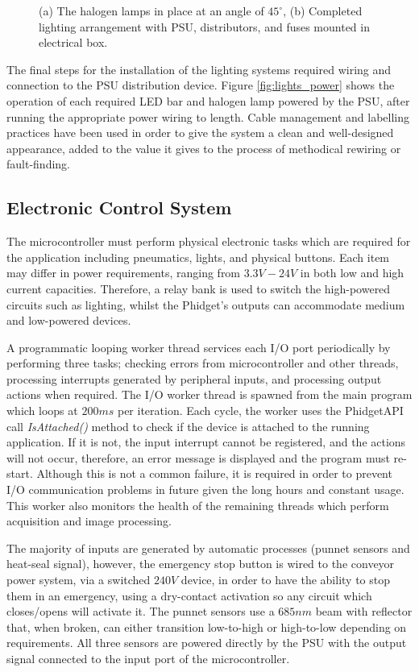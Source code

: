 \documentclass[fleqn,twoside,12pt]{report}
\begin{document}
\begin{figure}[ht]
	\caption{(a) The halogen lamps in place at an angle of $45^{\circ}$, (b) Completed lighting arrangement with PSU, distributors, and fuses mounted in electrical box.}
	\label{}
\end{figure}


The final steps for the installation of the lighting systems required wiring and connection to the PSU distribution device. Figure \ref{fig:lights_power} shows the operation of each required LED bar and halogen lamp powered by the PSU, after running the appropriate power wiring to length. Cable management and labelling practices have been used in order to give the system a clean and well-designed appearance, added to the value it gives to the process of methodical rewiring or fault-finding.



\subsection{Electronic Control System}


The microcontroller must perform physical electronic tasks which are required for the application including pneumatics, lights, and physical buttons. Each item may differ in power requirements, ranging from $3.3V-24V$ in both low and high current capacities. Therefore, a relay bank is used to switch the high-powered circuits such as lighting, whilst the Phidget\texttrademark's outputs can accommodate medium and low-powered devices. 


A programmatic looping worker thread services each I/O port periodically by performing three tasks; checking errors from microcontroller and other threads, processing interrupts generated by peripheral inputs, and processing output actions when required. The I/O worker thread is spawned from the main program which loops at $200ms$ per iteration. Each cycle, the worker uses the Phidget\texttrademark API call \textit{IsAttached()} method to check if the device is attached to the running application. If it is not, the input interrupt cannot be registered, and the actions will not occur, therefore, an error message is displayed and the program must re-start. Although this is not a common failure, it is required in order to prevent I/O communication problems in future given the long hours and constant usage. This worker also monitors the health of the remaining threads which perform acquisition and image processing. 

The majority of inputs are generated by automatic processes (punnet sensors and heat-seal signal), however, the emergency stop button is wired to the conveyor power system, via a switched $240V$ device, in order to have the ability to stop them in an emergency, using a dry-contact activation so any circuit which closes/opens will activate it. The punnet sensors use a $685nm$ beam with reflector that, when broken, can either transition low-to-high or high-to-low depending on requirements. All three sensors are powered directly by the PSU with the output signal connected to the input port of the microcontroller. 
\end{document}
